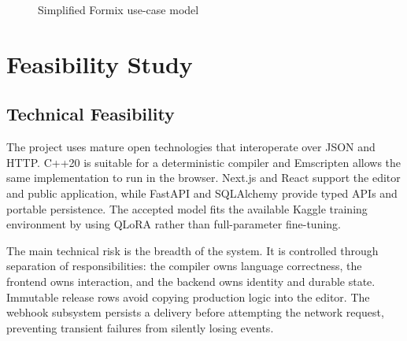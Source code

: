 \documentclass[12pt,a4paper,oneside]{report}
\begin{document}
\begin{figure}[H]
\centering
{}
\caption{Simplified Formix use-case model}
\label{fig:usecase}
\end{figure}

\chapter{Feasibility Study}

\section{Technical Feasibility}
The project uses mature open technologies that interoperate over JSON and HTTP. C++20 is
suitable for a deterministic compiler and Emscripten allows the same implementation to run in
the browser. Next.js and React support the editor and public application, while FastAPI and
SQLAlchemy provide typed APIs and portable persistence. The accepted model fits the available
Kaggle training environment by using QLoRA rather than full-parameter fine-tuning.

The main technical risk is the breadth of the system. It is controlled through separation of
responsibilities: the compiler owns language correctness, the frontend owns interaction, and
the backend owns identity and durable state. Immutable release rows avoid copying production
logic into the editor. The webhook subsystem persists a delivery before attempting the network
request, preventing transient failures from silently losing events.
\end{document}
